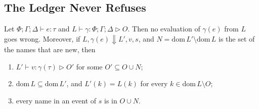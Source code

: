 \documentclass[acmsmall,nonacm,screen]{acmart}
\newcommand{\dom}{\mathrm{dom}\,}
\newcommand{\evto}{\Downarrow}
\newcommand{\own}{\mathrel{\triangleright}}
\begin{document}
\subsection{The Ledger Never Refuses}

\begin{theorem}[Safety]
\label{thm:safety}
Let $\Phi; \Gamma; \Delta \vdash e : \tau$ and $L \vdash \gamma : \Phi; \Gamma; \Delta \own O$.
Then no evaluation of $\gamma(e)$ from $L$ goes wrong. Moreover, if
$L, \gamma(e) \evto L', v, s$, and $N = \dom L' \setminus \dom L$ is the set of the names that
are new, then
\begin{enumerate}
\item $L' \vdash v : \gamma(\tau) \own O'$ for some $O' \subseteq O \cup N$;
\item $\dom L \subseteq \dom L'$, and $L'(k) = L(k)$ for every $k \in \dom L \setminus O$;
\item every name in an event of $s$ is in $O \cup N$.
\end{enumerate}
\end{theorem}
\end{document}
